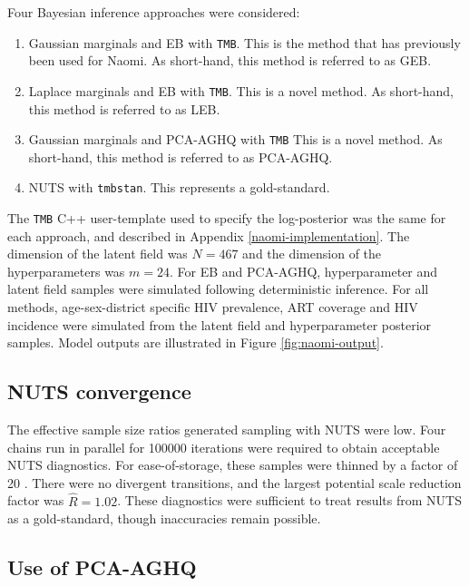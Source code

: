 \documentclass[a4paper, nobind]{templates/ociamthesis}
\providecommand{\tightlist}{%
  \setlength{\itemsep}{0pt}\setlength{\parskip}{0pt}}
\begin{document}
Four Bayesian inference approaches were considered:

\begin{enumerate}
\def\labelenumi{\arabic{enumi}.}
\tightlist
\item
  Gaussian marginals and EB with \texttt{TMB}.
  This is the method that has previously been used for Naomi.
  As short-hand, this method is referred to as GEB.
\item
  Laplace marginals and EB with \texttt{TMB}.
  This is a novel method.
  As short-hand, this method is referred to as LEB.
\item
  Gaussian marginals and PCA-AGHQ with \texttt{TMB}
  This is a novel method.
  As short-hand, this method is referred to as PCA-AGHQ.
\item
  NUTS with \texttt{tmbstan}.
  This represents a gold-standard.
\end{enumerate}

The \texttt{TMB} C++ user-template used to specify the log-posterior was the same for each approach, and described in Appendix \ref{naomi-implementation}.
The dimension of the latent field was \(N = 467\) and the dimension of the hyperparameters was \(m = 24\).
For EB and PCA-AGHQ, hyperparameter and latent field samples were simulated following deterministic inference.
For all methods, age-sex-district specific HIV prevalence, ART coverage and HIV incidence were simulated from the latent field and hyperparameter posterior samples.
Model outputs are illustrated in Figure \ref{fig:naomi-output}.

\hypertarget{nuts-convergence}{%
\subsection{NUTS convergence}\label{nuts-convergence}}

The effective sample size ratios generated sampling with NUTS were low.
Four chains run in parallel for 100000 iterations were required to obtain acceptable NUTS diagnostics.
For ease-of-storage, these samples were thinned by a factor of 20 .
There were no divergent transitions, and the largest potential scale reduction factor \autocite{gelman1992inference,vehtari2021rank} was \(\hat R = 1.02\).
These diagnostics were sufficient to treat results from NUTS as a gold-standard, though inaccuracies remain possible.

\hypertarget{use-of-pca-aghq}{%
\subsection{Use of PCA-AGHQ}\label{use-of-pca-aghq}}
\end{document}

